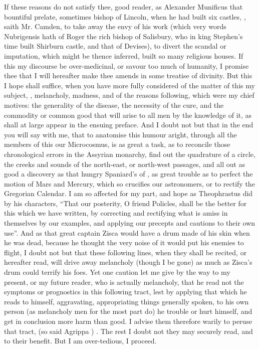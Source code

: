 If these reasons do not satisfy thee, good reader, as Alexander Munificus that
bountiful prelate, sometimes bishop of Lincoln, when he had built six castles,
, saith Mr. Camden, to take
away the envy of his work (which very words Nubrigensis hath of Roger the rich
bishop of Salisbury, who in king Stephen's time built Shirburn castle, and that
of Devises), to divert the scandal or imputation, which might be thence
inferred, built so many religious houses. If this my discourse be
over-medicinal, or savour too much of humanity, I promise thee that I will
hereafter make thee amends in some treatise of divinity. But this I hope shall
suffice, when you have more fully considered of the matter of this my subject,
, melancholy, madness, and of the reasons following, which
were my chief motives: the generality of the disease, the necessity of the
cure, and the commodity or common good that will arise to all men by the
knowledge of it, as shall at large appear in the ensuing preface. And I doubt
not but that in the end you will say with me, that to anatomise this humour
aright, through all the members of this our Microcosmus, is as great a task, as
to reconcile those chronological errors in the Assyrian monarchy, find out the
quadrature of a circle, the creeks and sounds of the north-east, or north-west
passages, and all out as good a discovery as that hungry
Spaniard's of , as great trouble as to perfect the motion of Mars and
Mercury, which so crucifies our astronomers, or to rectify the Gregorian
Calendar. I am so affected for my part, and hope as
Theophrastus did by his characters, \enquote{That our posterity, O
friend Policles, shall be the better for this which we have written, by
correcting and rectifying what is amiss in themselves by our examples, and
applying our precepts and cautions to their own use}. And as that great captain
Zisca would have a drum made of his skin when he was dead, because he thought
the very noise of it would put his enemies to flight, I doubt not but that
these following lines, when they shall be recited, or hereafter read, will
drive away melancholy (though I be gone) as much as Zisca's drum could terrify
his foes. Yet one caution let me give by the way to my present, or my future
reader, who is actually melancholy, that he read not the
symptoms or prognostics in this following tract, lest by
applying that which he reads to himself, aggravating, appropriating things
generally spoken, to his own person (as melancholy men for the most part do) he
trouble or hurt himself, and get in conclusion more harm than good. I advise
them therefore warily to peruse that tract,  (so said
Agrippa ) . The rest I doubt not they may
securely read, and to their benefit. But I am over-tedious, I proceed.

